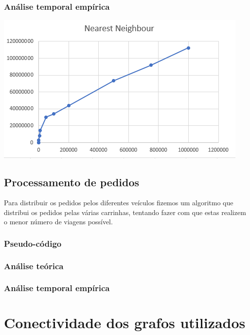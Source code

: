 \documentclass[article, a4paper, 12pt, oneside]{memoir}
\begin{document}
\subsection{Análise temporal empírica}

\begin{center}
\includegraphics[scale=0.5]{nearest_empiric.png}
\end{center}

\section{Processamento de pedidos}
Para distribuir os pedidos pelos diferentes veículos fizemos um algoritmo que distribui os pedidos pelas várias carrinhas,
tentando fazer com que estas realizem o menor número de viagens possível.

\subsection{Pseudo-código}
\subsection{Análise teórica}
\subsection{Análise temporal empírica}

\newpage
\chapter[Conectividade dos grafos utilizados][Conectividade dos grafos utilizados]{Conectividade dos grafos utilizados} \label{\thechapter}
\end{document}
